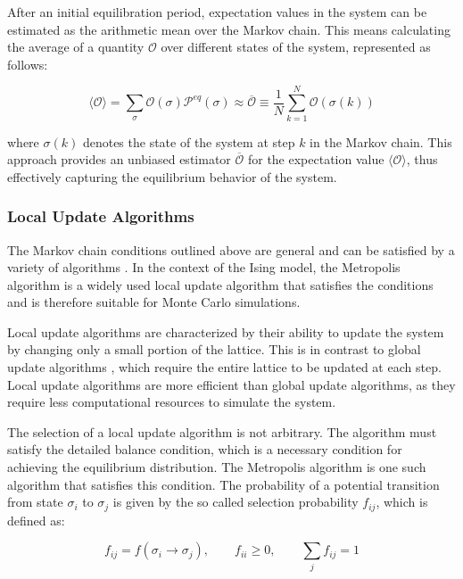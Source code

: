 After an initial equilibration period, expectation values in the system can be
estimated as the arithmetic mean over the Markov chain. This means calculating
the average of a quantity \( \mathcal{O} \) over different states of the system,
represented as follows:

\begin{equation}
    \langle \mathcal{O} \rangle = \sum_{\sigma}\mathcal{O}(\sigma)\mathcal{P}^{eq}(\sigma) \approx \overline{\mathcal{O}} \equiv \frac{1}{N} \sum_{k=1}^{N}\mathcal{O}(\sigma(k))
\end{equation}

where \( \sigma(k) \) denotes the state of the system at step \( k \) in the
Markov chain. This approach provides an unbiased estimator
$\overline{\mathcal{O}} $ for the expectation value \( \langle \mathcal{O}
\rangle \), thus effectively capturing the equilibrium behavior of the system.

\subsubsection{Local Update Algorithms}

The Markov chain conditions outlined above are general and can be satisfied by a
variety of algorithms \cite{Metropolis1953,Wolff1989,Glauber1963}. In the
context of the Ising model, the Metropolis algorithm\cite{Metropolis1953} is a
widely used local update algorithm that satisfies the conditions and is
therefore suitable for Monte Carlo simulations.

Local update algorithms are characterized by their ability to update the system
by changing only a small portion of the lattice. This is in contrast to global
update algorithms \cite{Wolff1989}, which require the entire lattice to be
updated at each step. Local update algorithms are more efficient than global
update algorithms, as they require less computational resources to simulate the
system.

The selection of a local update algorithm is not arbitrary. The algorithm must
satisfy the detailed balance condition, which is a necessary condition for
achieving the equilibrium distribution. The Metropolis algorithm is one such
algorithm that satisfies this condition. The probability of a potential
transition from state \( \sigma_i \) to \( \sigma_j \) is given by the so called
selection probability \( f_{ij} \), which is defined as:

\begin{equation}
    f_{ij} = f(\sigma_i \rightarrow \sigma_j), \qquad f_{ii} \geq 0, \qquad \sum_j f_{ij} = 1
\end{equation}


